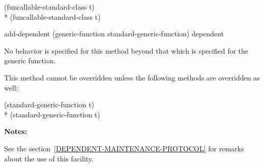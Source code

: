 \begin{defun}
\begin{defun}
\begin{tabbing}
     (funcallable-standard-class t)\\*
     (funcallable-standard-class t) 
\end{tabbing}
\end{defun}

\begin{defun}
add-dependent (generic-function standard-generic-function) dependent

No behavior is specified for this method beyond that which is specified for the generic function.

This method cannot be overridden unless the following methods are overridden as well:

\begin{tabbing}
     (standard-generic-function t) \\*
     (standard-generic-function t) 
\end{tabbing}
\end{defun}

\textbf{Notes:}

See the section~\ref{DEPENDENT-MAINTENANCE-PROTOCOL} for remarks about the use of
this facility.
\end{defun}

